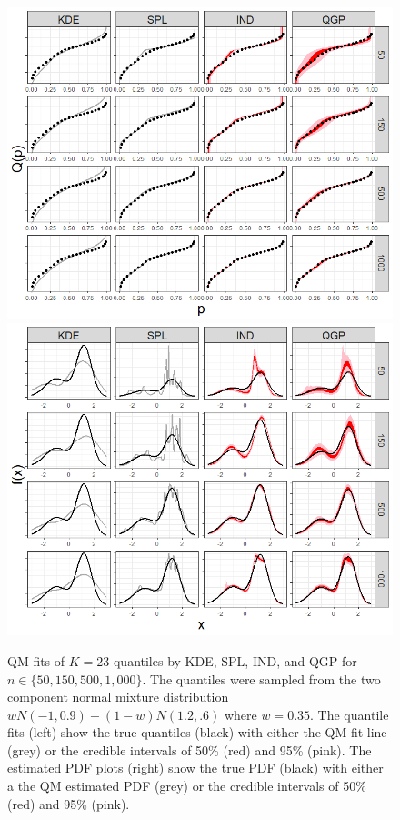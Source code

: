 \documentclass[preprint,12pt,authoryear]{elsarticle}
\begin{document}
\begin{figure}[hbt!]
\centering
  \centering
  \includegraphics[width=.49\linewidth]{Images/quants_gmix.png}
  \centering
  \includegraphics[width=.49\linewidth]{Images/dens_gmix.png}
\caption{QM fits of $K=23$ quantiles by KDE, SPL, IND, and QGP for $n \in \{50, 150, 500, 1{,}000\}$. The quantiles were sampled from the two component normal mixture distribution $w N(-1, 0.9) + (1-w)N(1.2, .6)$ where $w = 0.35$. The quantile fits (left) show the true quantiles (black) with either the QM fit line (grey) or the credible intervals of 50\% (red) and 95\% (pink). 
The estimated PDF plots (right) show the true PDF (black) with either a the QM estimated PDF (grey) or the credible intervals of 50\% (red) and 95\% (pink). }
\label{fig:gmix_fits}
\end{figure}








\end{document}
